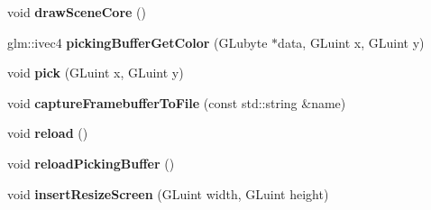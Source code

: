 \begin{DoxyCompactItemize}
\item 
void {\bfseries draw\+Scene\+Core} ()\hypertarget{structflw_1_1Engine_1_1EngineImpl_a0f7c05ade556f9fab1bcaeb94804f5b6}{}\label{structflw_1_1Engine_1_1EngineImpl_a0f7c05ade556f9fab1bcaeb94804f5b6}

\item 
glm\+::ivec4 {\bfseries picking\+Buffer\+Get\+Color} (G\+Lubyte $\ast$data, G\+Luint x, G\+Luint y)\hypertarget{structflw_1_1Engine_1_1EngineImpl_a2b8f6e91e4c4bdb9d29b4489a44c9613}{}\label{structflw_1_1Engine_1_1EngineImpl_a2b8f6e91e4c4bdb9d29b4489a44c9613}

\item 
void {\bfseries pick} (G\+Luint x, G\+Luint y)\hypertarget{structflw_1_1Engine_1_1EngineImpl_abd543f1fa91759fa742fcdcd7482adf5}{}\label{structflw_1_1Engine_1_1EngineImpl_abd543f1fa91759fa742fcdcd7482adf5}

\item 
void {\bfseries capture\+Framebuffer\+To\+File} (const std\+::string \&name)\hypertarget{structflw_1_1Engine_1_1EngineImpl_a690c2a840d403472c0edc72677b1e0b3}{}\label{structflw_1_1Engine_1_1EngineImpl_a690c2a840d403472c0edc72677b1e0b3}

\item 
void {\bfseries reload} ()\hypertarget{structflw_1_1Engine_1_1EngineImpl_a919a10526e2d3b4895b29b10d505de58}{}\label{structflw_1_1Engine_1_1EngineImpl_a919a10526e2d3b4895b29b10d505de58}

\item 
void {\bfseries reload\+Picking\+Buffer} ()\hypertarget{structflw_1_1Engine_1_1EngineImpl_a7c34a8957890b9dc3f615c728b5e66ce}{}\label{structflw_1_1Engine_1_1EngineImpl_a7c34a8957890b9dc3f615c728b5e66ce}

\item 
void {\bfseries insert\+Resize\+Screen} (G\+Luint width, G\+Luint height)\hypertarget{structflw_1_1Engine_1_1EngineImpl_ac252a78c0e73db463dd58939808809ad}{}\label{structflw_1_1Engine_1_1EngineImpl_ac252a78c0e73db463dd58939808809ad}

\end{DoxyCompactItemize}
